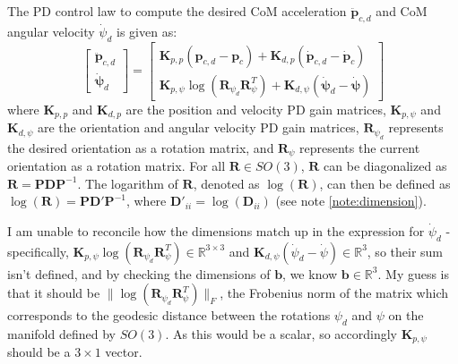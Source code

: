 \documentclass[12pt,a4paper]{article}
\theoremstyle{plain}
\theoremstyle{definition}
\theoremstyle{remark}
\newcounter{note}
\begin{document}
The PD control law to compute the desired CoM acceleration $\ddot{\mathbf{p}}_{c,d}$ and CoM angular velocity $\dot{\psi}_d$ is given as:
\[
\begin{bmatrix}
    \mathbf{\ddot{p}}_{c,d} \\[4pt]
    \mathbf{\dot{\psi}}_d
\end{bmatrix} = 
\begin{bmatrix}
    \mathbf{K}_{p,p}(\mathbf{p}_{c,d} - \mathbf{p}_c) + \mathbf{K}_{d,p}(\mathbf{\dot{p}}_{c,d} - \mathbf{\dot{p}}_c) \\[4pt]
    \mathbf{K}_{p,\psi}\log({\mathbf{R}_{\psi_d}\mathbf{R}_\psi^T}) + \mathbf{K}_{d,\psi}(\mathbf{\dot{\psi}}_d - \mathbf{\dot{\psi}})
\end{bmatrix}
\]
where $\mathbf{K}_{p,p}$ and $\mathbf{K}_{d,p}$ are the position and velocity PD gain matrices, $\mathbf{K}_{p,\psi}$ and $\mathbf{K}_{d,\psi}$ are the orientation and angular velocity PD gain matrices, $\mathbf{R}_{\psi_d}$ represents the desired orientation as a rotation matrix, and $\mathbf{R}_\psi$ represents the current orientation as a rotation matrix. For all $\mathbf{R} \in SO(3)$, $\mathbf{R}$ can be diagonalized as $\mathbf{R} = \mathbf{PDP}^{-1}$. The logarithm of $\mathbf{R}$, denoted as $\log(\mathbf{R})$, can then be defined as $\log(\mathbf{R}) = \mathbf{PD}'\mathbf{P}^{-1}$, where $\mathbf{D}'_{ii} = \log(\mathbf{D}_{ii})$ (see note \ref{note:dimension}).
\begin{note}
I am unable to reconcile how the dimensions match up in the expression for $\dot{\psi}_d$ - specifically, $\mathbf{K}_{p,\psi}\log({\mathbf{R}_{\psi_d}\mathbf{R}_\psi^T}) \in \mathbb{R}^{3 \times 3}$ and $\mathbf{K}_{d,\psi}(\dot{\psi}_d - \dot{\psi}) \in \mathbb{R}^3$, so their sum isn't defined, and by checking the dimensions of $\mathbf{b}$, we know $\mathbf{b} \in \mathbb{R}^3$. My guess is that it should be $\| \log({\mathbf{R}_{\psi_d}\mathbf{R}_\psi^T}) \|_F$, the Frobenius norm of the matrix which corresponds to the geodesic distance between the rotations $\psi_d$ and $\psi$ on the manifold defined by $SO(3)$. As this would be a scalar, so accordingly $\mathbf{K}_{p,\psi}$ should be a $3 \times 1$ vector.
\label{note:dimension}
\end{note}
\end{document}
